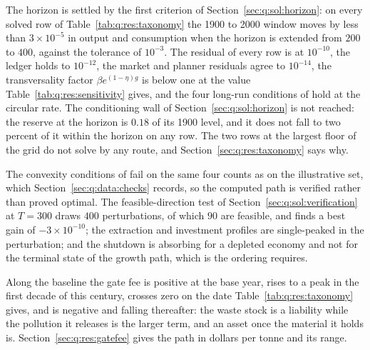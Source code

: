  The horizon is settled by the first criterion of Section~\ref{sec:q:sol:horizon}: on every solved row of Table~\ref{tab:q:res:taxonomy} the 1900 to 2000 window moves by less than $3\times10^{-5}$ in output and consumption when the horizon is extended from $200$ to $400$, against the tolerance of $10^{-3}$. The residual of every row is at $10^{-10}$, the ledger holds to $10^{-12}$, the market and planner residuals agree to $10^{-14}$, the transversality factor $\beta e^{(1-\eta)g}$ is below one at the value Table~\ref{tab:q:res:sensitivity} gives, and the four long-run conditions of  hold at the circular rate. The conditioning wall of Section~\ref{sec:q:sol:horizon} is not reached: the reserve at the horizon is $0.18$ of its 1900 level, and it does not fall to two percent of it within the horizon on any row. The two rows at the largest floor of the grid do not solve by any route, and Section~\ref{sec:q:res:taxonomy} says why.

 The convexity conditions of  fail on the same four counts as on the illustrative set, which Section~\ref{sec:q:data:checks} records, so the computed path is verified rather than proved optimal. The feasible-direction test of Section~\ref{sec:q:sol:verification} at $T=300$ draws $400$ perturbations, of which $90$ are feasible, and finds a best gain of $-3\times10^{-10}$; the extraction and investment profiles are single-peaked in the perturbation; and the shutdown is absorbing for a depleted economy and not for the terminal state of the growth path, which is the ordering  requires.

 Along the baseline the gate fee is positive at the base year, rises to a peak in the first decade of this century, crosses zero on the date Table~\ref{tab:q:res:taxonomy} gives, and is negative and falling thereafter: the waste stock is a liability while the pollution it releases is the larger term, and an asset once the material it holds is. Section~\ref{sec:q:res:gatefee} gives the path in dollars per tonne and its range.

